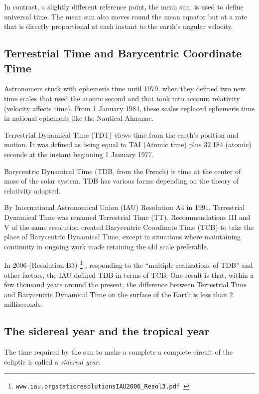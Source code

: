 In contrast, a slightly different reference point, the mean sun,
is used to define universal time. The mean sun also moves round the mean 
equator but at a rate that is directly proportional at each instant to the 
earth's angular velocity. 

\subsection{Terrestrial Time and Barycentric Coordinate Time}

Astronomers stuck with ephemeris time until 1979, when they defined two new 
time scales that used the atomic second and that took into account 
relativity (velocity affects time). From 1 January 1984, these scales 
replaced ephemeris time in national ephemeris like the Nautical Almanac.

Terrestrial Dynamical Time (TDT) views time from the earth's position and 
motion. It was defined as being equal to TAI (Atomic time) plus 
32.184 (atomic) seconds at the instant beginning 1 January 1977.

Barycentric Dynamical Time (TDB, from the French) is time at the center of 
mass of the solar system. TDB has various forms depending on the theory of 
relativity adopted.

By International Astronomical Union (IAU) Resolution A4 in 1991, 
Terrestrial Dynamical Time was renamed Terrestrial Time (TT). 
Recommendations III and V of the same resolution created 
Barycentric Coordinate Time (TCB) to take the place of Barycentric 
Dynamical Time, except in situations where maintaining continuity in 
ongoing work made retaining the old scale preferable.

In 2006 (Resolution B3)
\footnote{
\tt www.iau.org\/static\/resolutions\/IAU2006\_Resol3.pdf
}
, responding to the ``multiple realizations of TDB''
and other factors, the IAU defined TDB in terms of TCB. One result is that, 
within a few thousand years around the present, the difference between 
Terrestrial Time and Barycentric Dynamical Time on the surface of the Earth 
is less than 2 milliseconds. 

\subsection{The sidereal year and the tropical year}

The time required by the sun to make a complete a complete circuit of the 
ecliptic is called a {\it sidereal year}. 

